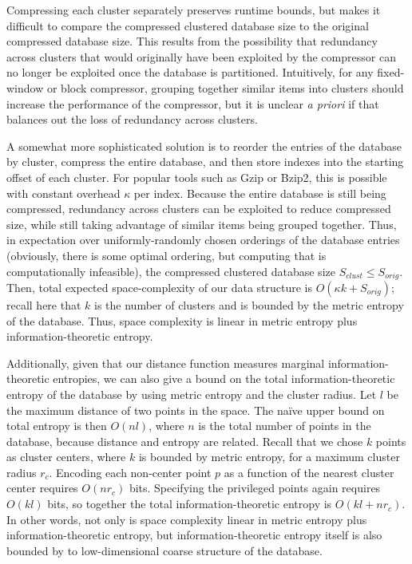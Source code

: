 \documentclass[review,preprint,12pt]{elsarticle}
\theoremstyle{definition}
\theoremstyle{remark}
\begin{document}
Compressing each cluster separately preserves runtime bounds, but makes it difficult to compare the compressed clustered database size to the original compressed database size.
This results from the possibility that redundancy across clusters that would originally have been exploited by the compressor can no longer be exploited 
once the database is partitioned.
Intuitively, for any fixed-window or block compressor, grouping together similar items into clusters should increase the performance of the compressor, but it is unclear \textit{a priori} if that balances out the loss of redundancy across clusters.

A somewhat more sophisticated solution is to reorder the entries of the database by cluster, compress the entire database, and then store indexes into the starting offset of each cluster.
For popular tools such as Gzip or Bzip2, this is possible with constant overhead $\kappa$ per index.
Because the entire database is still being compressed, redundancy across clusters can be exploited to reduce compressed size, while still taking advantage of similar items being grouped together.
Thus, in expectation over uniformly-randomly chosen orderings of the database entries (obviously, there is some optimal ordering, but computing that is computationally infeasible), the compressed clustered database size $S_{clust} \le S_{orig}$.
Then, total expected space-complexity of our data structure is $O(\kappa k + S_{orig})$; recall here that $k$ is the number of clusters and is bounded by the metric entropy of the database.
Thus, space complexity is linear in metric entropy plus information-theoretic entropy.

Additionally, given that our distance function measures marginal information-theoretic entropies, we can also give a bound on the total information-theoretic entropy of the database by using metric entropy and the cluster radius.
Let $l$ be the maximum distance of two points in the space.
The na\"ive upper bound on total entropy is then $O(nl)$, where $n$ is the total number of points in the database, because distance and entropy are related.
Recall that we chose $k$ points as cluster centers, where $k$ is bounded by metric entropy, for a maximum cluster radius $r_c$.
Encoding each non-center point $p$ as a function of the nearest cluster center requires $O(n  r_c)$ bits.
Specifying the privileged points again requires $O(kl)$ bits, so together the total information-theoretic entropy is $O(kl + n r_c)$.
In other words, not only is space complexity linear in metric entropy plus information-theoretic entropy, but information-theoretic entropy itself is also bounded by to low-dimensional coarse structure of the database.
\end{document}
